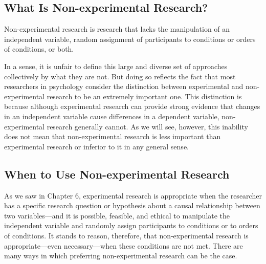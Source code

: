 \subsection{What Is Non-experimental Research?}

Non-experimental research is research that lacks the manipulation of an independent variable, random assignment of participants to conditions or orders of conditions, or both.

In a sense, it is unfair to define this large and diverse set of approaches collectively by what they are not. But doing so reflects the fact that most researchers in psychology consider the distinction between experimental and non-experimental research to be an extremely important one. This distinction is because although experimental research can provide strong evidence that changes in an independent variable cause differences in a dependent variable, non-experimental research generally cannot. As we will see, however, this inability does not mean that non-experimental research is less important than experimental research or inferior to it in any general sense.

\subsection{When to Use Non-experimental Research}

As we saw in Chapter 6, experimental research is appropriate when the researcher has a specific research question or hypothesis about a causal relationship between two variables---and it is possible, feasible, and ethical to manipulate the independent variable and randomly assign participants to conditions or to orders of conditions. It stands to reason, therefore, that non-experimental research is appropriate---even necessary---when these conditions are not met. There are many ways in which preferring non-experimental research can be the case.


